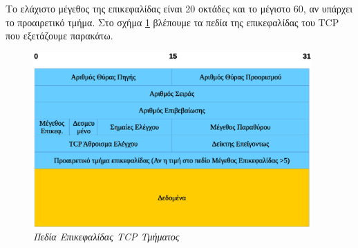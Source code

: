 Το ελάχιστο μέγεθος της επικεφαλίδας είναι 20 οκτάδες και το μέγιστο 60, αν υπάρχει το προαιρετικό τμήμα. Στο σχήμα \ref{4-3} βλέπουμε τα πεδία της επικεφαλίδας του TCP που εξετάζουμε παρακάτω.

\begin{figure}[!ht]
 \centering
 \includegraphics[width=0.95\textwidth]{images/chapter4/4-3}
 \caption {\textsl{Πεδία Επικεφαλίδας TCP Τμήματος}}
 \label{4-3}
\end{figure}

